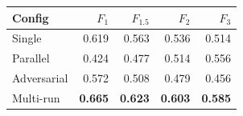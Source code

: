 \begin{tabular}{@{}lrrrr@{}}
\toprule
Config & $F_{1}$ & $F_{1.5}$ & $F_{2}$ & $F_{3}$ \\
\midrule
Single & 0.619 & 0.563 & 0.536 & 0.514 \\
Parallel & 0.424 & 0.477 & 0.514 & 0.556 \\
Adversarial & 0.572 & 0.508 & 0.479 & 0.456 \\
Multi-run & \textbf{0.665} & \textbf{0.623} & \textbf{0.603} & \textbf{0.585} \\
\bottomrule
\end{tabular}
